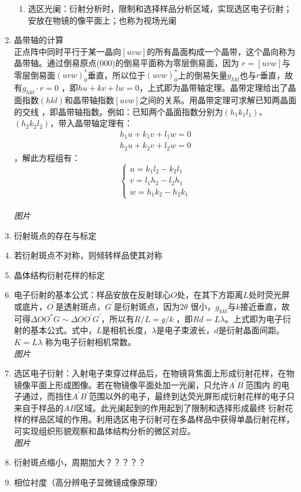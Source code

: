 \documentclass[12pt,a4paper]{article}
\begin{document}
\begin{enumerate}
\begin{enumerate}
            \item 选区光阑：衍射分析时，限制和选择样品分析区域，实现选区电子衍射；安放在物镜的像平面上；也称为视场光阑
        \end{enumerate}
        \item 晶带轴的计算\\正点阵中同时平行于某一晶向$[uvw]$的所有晶面构成一个晶带，这个晶向称为晶带轴。通过倒易原点(000)的倒易平面称为零层倒易面，因为
            $r=[uvw]$与零层倒易面$(uvw)_{0}^{*}$垂直，所以位于$(uvw)_{0}^{*}$上的倒易矢量$g_{hkl}$也与$r$垂直，故有$g_{h k l} \cdot r=0$
            ，即$h u+k v+l w=0$，上式即为晶带轴定理。晶带定理给出了晶面指数$(hkl)$和晶带轴指数$[uvw]$之间的关系。用晶带定理可求解已知两晶面的交线
            ，即晶带轴指数。例如：已知两个晶面指数分别为$\left(h_{1} k_{1} l_{1}\right)$、$\left(h_{2} k_{2} l_{2}\right)$，带入晶带轴定理有：
            $$\begin{array}{l}{h_{1} u+k_{1} v+l_{1} w=0} \\ {h_{2} u+k_{2} v+l_{2} w=0}\end{array}$$，解此方程组有：
            $$\left\{\begin{array}{l}{{u}=k_{1} l_{2}-k_{2} l_{1}} \\ {{v}=l_{1} h_{2}-l_{2} h_{1}} \\ {w={h}_{1} k_{
            2}-{h}_{2} {k}_{1}}\end{array}\right.$$   \\\emph{图片}
        \item 衍射斑点的存在与标定
        \item 若衍射斑点不对称，则倾转样品使其对称
        \item 晶体结构衍射花样的标定
        \item 电子衍射的基本公式：样品安放在反射球心$O$处，在其下方距离$L$处时荧光屏或底片，$O^{'}$是透射斑点，$G^{'}$是衍射斑点，因为$2\theta$
            很小，$g_{hkl}$与$k$接近垂直，故可得$\Delta O O^{*} G \sim \Delta O O^{\prime} G^{\prime}$，所以有$R / L=g / k$
            ，即$R d=L \lambda$。上式即为电子衍射的基本公式。式中，$L$是相机长度，$\lambda$是电子束波长，$d$是衍射晶面间距。$K=L\lambda$
            称为电子衍射相机常数。
            \\ \emph{图片}
        \item 选区电子衍射：入射电子束穿过样品后，在物镜背焦面上形成衍射花样，在物镜像平面上形成图像。若在物镜像平面处加一光阑，只允许$A^{'}B^{'}$范围内
            的电子通过，而挡住$A^{'}B^{'}$范围以外的电子，最终到达荧光屏形成衍射花样的电子只来自于样品的$AB$区域。此光阑起到的作用起到了限制和选择形成最终
            衍射花样的样品区域的作用。利用选区电子衍射可在多晶样品中获得单晶衍射花样，可实现组织形貌观察和晶体结构分析的微区对应。
            \\\emph{图片}
        \item 衍射斑点缩小，周期加大？？？？？
        \item 相位衬度（高分辨电子显微镜成像原理）
            

\end{enumerate}
\end{document}

